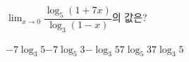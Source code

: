 $\displaystyle\lim_{x\to 0}\dfrac{\log_5(1+7x)}{\log_3(1-x)}$의 값은?
\begin{choices32}{$-7\log_3 5$}{$-7\log_5 3$}{$-\log_3 5$}{$7\log_5 3$}{$7\log_3 5$}\end{choices32}
